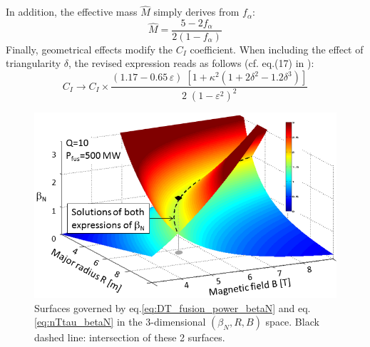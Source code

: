 In addition, the effective mass $\hat M$ simply derives from $f_\alpha$:
\begin{equation*}
	\hat M = \frac{5  - 2f_\alpha}{2(1-f_\alpha)}
\end{equation*}
Finally, geometrical effects modify the $C_I$ coefficient. When including the effect of triangularity $\delta$, the revised expression reads as follows (cf. eq.(17) in ):
\begin{equation*}
	C_I \to C_I \times 
	\frac{(1.17-0.65\, \varepsilon)\; \left[ 1+\kappa^2(1+2\delta^2-1.2\delta^3) \right]} {2\;(1-\varepsilon^2)^2}
\end{equation*}

\begin{figure}[h]
	\centering
	\includegraphics[width=1\textwidth]{figures/Fig_3D_betaN_R_B_ITER_v3.png}
	\caption{Surfaces governed by eq.\ref{eq:DT_fusion_power_betaN} and eq.\ref{eq:nTtau_betaN} in the 3-dimensional $(\beta_N,R,B)$ space. Black dashed line: intersection of these 2 surfaces.}
	\label{fig:R_B_betaN_3D}
\end{figure}

